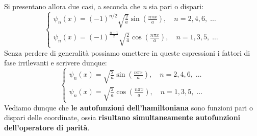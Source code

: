 \documentclass[a4paper,12pt,oneside]{book}
\begin{document}
Si presentano allora due casi, a seconda che \emph{n} sia pari o dispari:
\begin{equation}
  \begin{cases}
    \psi_n(x)= (-1)^{n/2}\sqrt{\frac{2}{a}}\sin(\frac{n\pi x}{a}),\quad n=2,4,6,\;\dots\\
    \psi_n(x)= (-1)^{\frac{n+1}{2}}\sqrt{\frac{2}{a}}\cos(\frac{n\pi x}{a}),\quad n=1,3,5,\;\dots
  \end{cases}
\end{equation}
Senza perdere di generalità possiamo omettere in queste espressioni i fattori di fase irrilevanti e scrivere dunque:
\begin{equation}
  \begin{cases}
    \psi_n(x)= \sqrt{\frac{2}{a}}\sin(\frac{n\pi x}{a}),\quad n=2,4,6,\;\dots\\
    \psi_n(x)= \sqrt{\frac{2}{a}}\cos(\frac{n\pi x}{a}),\quad n=1,3,5,\;\dots
  \end{cases}
\end{equation}
Vediamo dunque che \textbf{le autofunzioni dell'hamiltoniana} sono funzioni pari o dispari delle coordinate, ossia \textbf{risultano simultaneamente autofunzioni dell'operatore di parità}.
\end{document}
